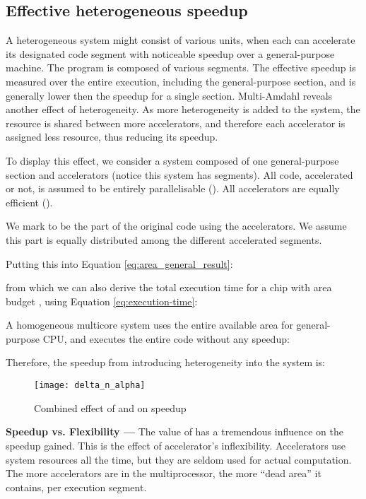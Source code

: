 \documentclass[twocolumn,english]{IEEEtran}
\begin{document}
\subsection{Effective heterogeneous speedup}

A heterogeneous system might consist of various units, when each can
accelerate its designated code segment with noticeable speedup over
a general-purpose machine. The program is composed of various segments.
The effective speedup is measured over the entire execution, including
the general-purpose section, and is generally lower then the speedup
for a single section. Multi-Amdahl reveals another effect of heterogeneity.
As more heterogeneity is added to the system, the resource is shared
between more accelerators, and therefore each accelerator is assigned
less resource, thus reducing its speedup.

To display this effect, we consider a system composed of one general-purpose
section and  accelerators (notice this system has  segments).
All code, accelerated or not, is assumed to be entirely parallelisable
(). All accelerators are equally efficient ().




We mark  to be the part of the original code using the accelerators.
We assume this part is equally distributed among the different accelerated
segments.


Putting this into Equation \eqref{eq:area_general_result}:


from which we can also derive the total execution time for a chip
with area budget , using Equation \eqref{eq:execution-time}:




A homogeneous multicore system uses the entire available area for
general-purpose CPU, and executes the entire code without any speedup:


Therefore, the speedup from introducing heterogeneity into the system
is:




\begin{figure}[t]
\texttt{[image: delta\_n\_alpha]}

\caption{\label{fig:n_a_de}Combined effect of and 
on speedup}
\end{figure}


\textbf{Speedup vs. Flexibility ---} The value of  has a tremendous
influence on the speedup gained. This is the effect of accelerator's
inflexibility. Accelerators use system resources all the time, but
they are seldom used for actual computation. The more accelerators
are in the multiprocessor, the more {}``dead area'' it contains,
per execution segment.
\end{document}

